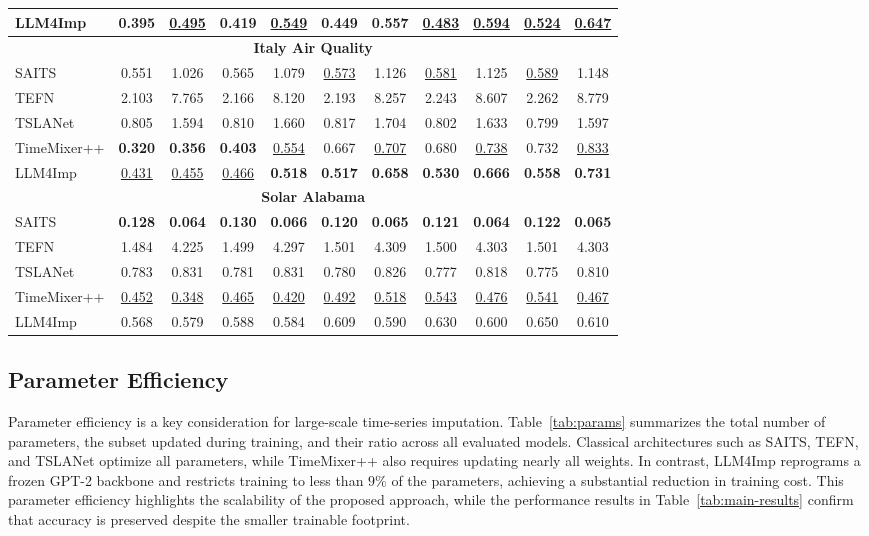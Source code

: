\documentclass[conference]{IEEEtran}
\begin{document}
\begin{table}[!ht]
\begin{tabular}{lcccccccccc}
LLM4Imp      & 0.395 & \underline{0.495} & 0.419 & \underline{0.549} & 0.449 & 0.557 & \underline{0.483} & \underline{0.594} & \underline{0.524} & \underline{0.647} \\
\midrule
\multicolumn{11}{c}{\textbf{Italy Air Quality}}\\
SAITS        & 0.551 & 1.026 & 0.565 & 1.079 & \underline{0.573} & 1.126 & \underline{0.581} & 1.125 & \underline{0.589} & 1.148 \\
TEFN         & 2.103 & 7.765 & 2.166 & 8.120 & 2.193 & 8.257 & 2.243 & 8.607 & 2.262 & 8.779 \\
TSLANet      & 0.805 & 1.594 & 0.810 & 1.660 & 0.817 & 1.704 & 0.802 & 1.633 & 0.799 & 1.597 \\
TimeMixer++  & \textbf{0.320} & \textbf{0.356} & \textbf{0.403} & \underline{0.554} & 0.667 & \underline{0.707} & 0.680 & \underline{0.738} & 0.732 & \underline{0.833} \\
LLM4Imp      & \underline{0.431} & \underline{0.455} & \underline{0.466} & \textbf{0.518} & \textbf{0.517} & \textbf{0.658} & \textbf{0.530} & \textbf{0.666} & \textbf{0.558} & \textbf{0.731} \\
\midrule
\multicolumn{11}{c}{\textbf{Solar Alabama}}\\
SAITS        & \textbf{0.128} & \textbf{0.064} & \textbf{0.130} & \textbf{0.066} & \textbf{0.120} & \textbf{0.065} & \textbf{0.121} & \textbf{0.064} & \textbf{0.122} & \textbf{0.065} \\
TEFN         & 1.484 & 4.225 & 1.499 & 4.297 & 1.501 & 4.309 & 1.500 & 4.303 & 1.501 & 4.303 \\
TSLANet      & 0.783 & 0.831 & 0.781 & 0.831 & 0.780 & 0.826 & 0.777 & 0.818 & 0.775 & 0.810 \\
TimeMixer++  & \underline{0.452} & \underline{0.348} & \underline{0.465} & \underline{0.420} & \underline{0.492} & \underline{0.518} & \underline{0.543} & \underline{0.476} & \underline{0.541} & \underline{0.467} \\
LLM4Imp      & 0.568 & 0.579 & 0.588 & 0.584 & 0.609 & 0.590 & 0.630 & 0.600 & 0.650 & 0.610 \\
\bottomrule
\end{tabular}
\end{table}
\subsection{Parameter Efficiency}
Parameter efficiency is a key consideration for large-scale time-series imputation.
Table~\ref{tab:params} summarizes the total number of parameters, the subset updated during training, and their ratio across all evaluated models.
Classical architectures such as SAITS, TEFN, and TSLANet optimize all parameters, while TimeMixer++ also requires updating nearly all weights.
In contrast, LLM4Imp reprograms a frozen GPT-2 backbone and restricts training to less than $9\%$ of the parameters, achieving a substantial reduction in training cost.
This parameter efficiency highlights the scalability of the proposed approach, while the performance results in Table~\ref{tab:main-results} confirm that accuracy is preserved despite the smaller trainable footprint.
\end{document}
